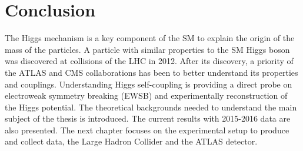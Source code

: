 
\section{Conclusion}
\label{chap1:Conc}
The Higgs mechanism is a key component of the SM to explain the origin of the mass of the particles. A particle with similar properties to the SM Higgs boson was discovered at collisions of the LHC in 2012. After its discovery, a priority of the ATLAS and CMS collaborations has been to better understand its properties and couplings. Understanding Higgs self-coupling is providing a direct probe on electroweak symmetry breaking (EWSB) and experimentally reconstruction of the Higgs potential. The theoretical backgrounds needed to understand the main subject of the thesis is introduced. The current \HHyybb results with 2015-2016 data are also presented. %
The next chapter focuses on the experimental setup to produce and collect data, the Large Hadron Collider and the ATLAS detector. 

